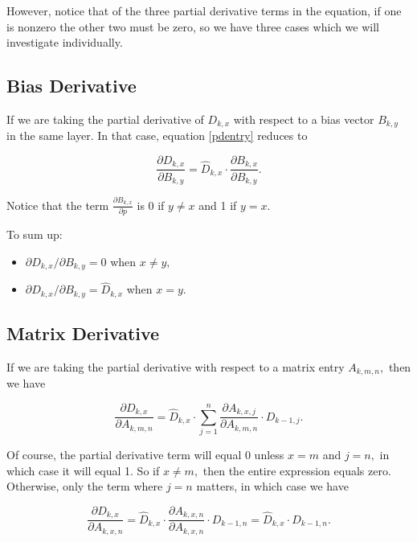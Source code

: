\documentclass{article}
\begin{document}
However, notice that of the three partial derivative terms in the equation, if one is nonzero the other two must be zero, so we have three cases which we will investigate individually.

\subsection{Bias Derivative}

If we are taking the partial derivative of $D_{k,x}$ with respect to a bias vector $B_{k,y}$ in the same layer. In that case, equation \ref{pdentry} reduces to

\begin{equation}
\frac{\partial D_{k,x}}{\partial B_{k,y}} = \hat D_{k,x} \cdot \frac{\partial B_{k,x}}{\partial B_{k,y}}.
\end{equation}

Notice that the term $\frac{\partial B_{k,x}}{\partial p}$ is 0 if $y \neq x$ and 1 if $y = x.$

To sum up:

\begin{itemize}

\item $\partial D_{k,x} / \partial B_{k,y} = 0$ when $x \neq y,$

\item $\partial D_{k,x} / \partial B_{k,y} = \hat D_{k,x}$ when $x = y.$

\end{itemize}

\subsection{Matrix Derivative}

If we are taking the partial derivative with respect to a matrix entry $A_{k,m,n},$ then we have

\begin{equation}
\frac{\partial D_{k,x}}{\partial A_{k,m,n}} = \hat D_{k,x} \cdot \sum_{j=1}^n \frac{\partial A_{k,x,j}}{\partial A_{k,m,n}} \cdot D_{k-1,j}.
\end{equation}

Of course, the partial derivative term will equal 0 unless $x = m$ and $j = n,$ in which case it will equal 1. So if $x \neq m,$ then the entire expression equals zero. Otherwise, only the term where $j = n$ matters, in which case we have

$$\frac{\partial D_{k,x}}{\partial A_{k,x,n}} = \hat D_{k,x} \cdot \frac{\partial A_{k,x,n}}{\partial A_{k,x,n}} \cdot D_{k-1,n} = \hat D_{k, x} \cdot D_{k-1, n}.$$
\end{document}
